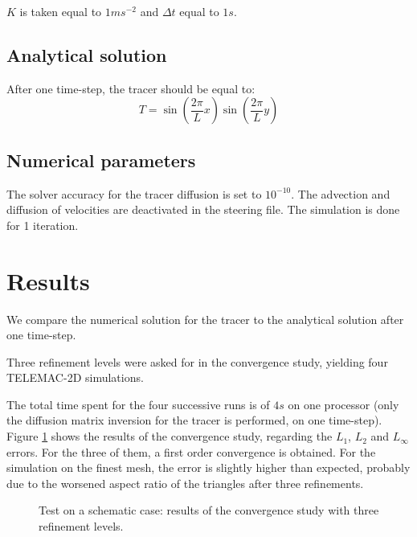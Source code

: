 $K$ is taken equal to $1 m s^{-2}$ and $\Delta t$ equal to $1s$.

\subsection{Analytical solution}

After one time-step, the tracer should be equal to:
\begin{equation}
T = \sin \left(\dfrac{2 \pi}{L}x \right) \sin \left( \dfrac{2 \pi}{L}y\right)
\end{equation}

\subsection{Numerical parameters}
The solver accuracy for the tracer diffusion is set to $10^{-10}$.
The advection and diffusion of velocities are deactivated in the steering file.
The simulation is done for 1 iteration.


\section{Results}
We compare the numerical solution for the tracer
to the analytical solution after one time-step.

Three refinement levels were asked for in the convergence study, yielding
four TELEMAC-2D simulations.

The total time spent for the four successive runs is of $4s$ on one processor
(only the diffusion matrix inversion for the tracer is performed, on one time-step).
Figure \ref{fig:figure2} shows the results of the convergence study, regarding
the $L_1$, $L_2$ and $L_{\infty}$ errors. For the three of them, a first order
convergence is obtained. For the simulation on the finest mesh, the error
is slightly higher than expected, probably due to the worsened aspect ratio
of the triangles after three refinements.
\begin{figure}
  \begin{center}
    \caption{Test on a schematic case: results of the convergence study
      with three refinement levels.}
    \label{fig:figure2}
  \end{center}
\end{figure}
